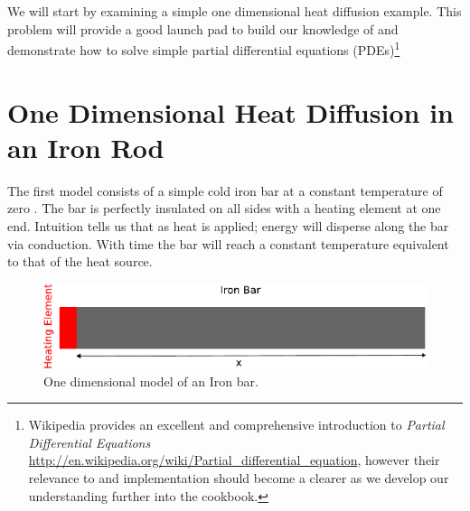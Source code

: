 
%
%
%

We will start by examining a simple one dimensional heat diffusion example. This problem will provide a good launch pad to build our knowledge of \esc and demonstrate how to solve simple partial differential equations (PDEs)\footnote{Wikipedia provides an excellent and comprehensive introduction to \textit{Partial Differential Equations} \url{http://en.wikipedia.org/wiki/Partial_differential_equation}, however their relevance to \esc and implementation should become a clearer as we develop our understanding further into the cookbook.}

\section{One Dimensional Heat Diffusion in an Iron Rod}

The first model consists of a simple cold iron bar at a constant temperature of zero . The bar is perfectly insulated on all sides with a heating element at one end. Intuition tells us that as heat is applied; energy will disperse along the bar via conduction. With time the bar will reach a constant temperature equivalent to that of the heat source.
\begin{figure}[h!]
\centerline{\includegraphics[width=4.in]{figures/onedheatdiff}}
\caption{One dimensional model of an Iron bar.}
\label{fig:onedhdmodel}
\end{figure}

